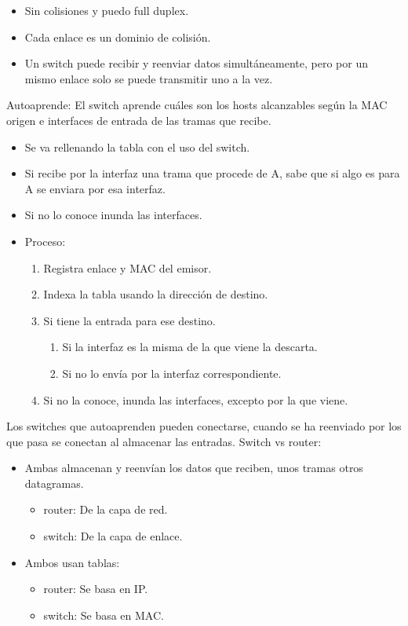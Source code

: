 \documentclass[12pt, twoside, openright]{report} %
\begin{document}
\begin{itemize}
	\item Sin colisiones y puedo full duplex.
	\item Cada enlace es un dominio de colisión.
	\item Un switch puede recibir y reenviar datos simultáneamente, pero
	      por un mismo enlace solo se puede transmitir uno a la vez.
\end{itemize}
\pagebreak
Autoaprende: El switch aprende cuáles son los hosts alcanzables
según la MAC origen e interfaces de entrada de las tramas que
recibe.

\begin{itemize}
	\item Se va rellenando la tabla con el uso del switch.
	\item Si recibe por la interfaz una trama que procede de A, sabe que
	      si algo es para A se enviara por esa interfaz.
	\item Si no lo conoce inunda las interfaces.
	\item Proceso:

	      \begin{enumerate}
		      \item Registra enlace y MAC del emisor.
		      \item Indexa la tabla usando la dirección de destino.
		      \item Si tiene la entrada para ese destino.

		            \begin{enumerate}
			            \item Si la interfaz es la misma de la que viene la descarta.
			            \item Si no lo envía por la interfaz correspondiente.
		            \end{enumerate}
		      \item Si no la conoce, inunda las interfaces, excepto por la que
		            viene.
	      \end{enumerate}
\end{itemize}

Los switches que autoaprenden pueden conectarse, cuando se ha
reenviado por los que pasa se conectan al almacenar las entradas.
Switch vs router:

\begin{itemize}
	\item Ambas almacenan y reenvían los datos que reciben, unos tramas
	      otros datagramas.

	      \begin{itemize}
		      \item router: De la capa de red.
		      \item switch: De la capa de enlace.
	      \end{itemize}
	\item Ambos usan tablas:

	      \begin{itemize}
		      \item router: Se basa en IP.
		      \item switch: Se basa en MAC.
	      \end{itemize}
\end{itemize}
\end{document}
